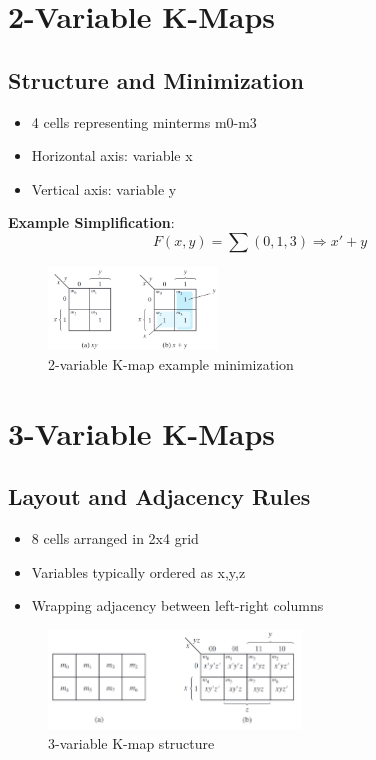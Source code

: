 \documentclass[11pt]{article}
\begin{document}
\section{2-Variable K-Maps}
\subsection{Structure and Minimization}
\begin{itemize}
\item 4 cells representing minterms m0-m3
\item Horizontal axis: variable x
\item Vertical axis: variable y
\end{itemize}

\textbf{Example Simplification}:
\begin{equation}
F(x,y) = \sum(0,1,3) \Rightarrow x' + y
\end{equation}

\begin{figure}[htbp]
\centering
\includegraphics[width=0.4\textwidth]{figs/2ex.png}
\caption{2-variable K-map example minimization}
\label{fig:2ex}
\end{figure}

\section{3-Variable K-Maps}
\subsection{Layout and Adjacency Rules}
\begin{itemize}
\item 8 cells arranged in 2x4 grid
\item Variables typically ordered as x,y,z
\item Wrapping adjacency between left-right columns
\end{itemize}

\begin{figure}[htbp]
\centering
\includegraphics[width=0.6\textwidth]{figs/3var.png}
\caption{3-variable K-map structure}
\label{fig:3var}
\end{figure}
\end{document}
